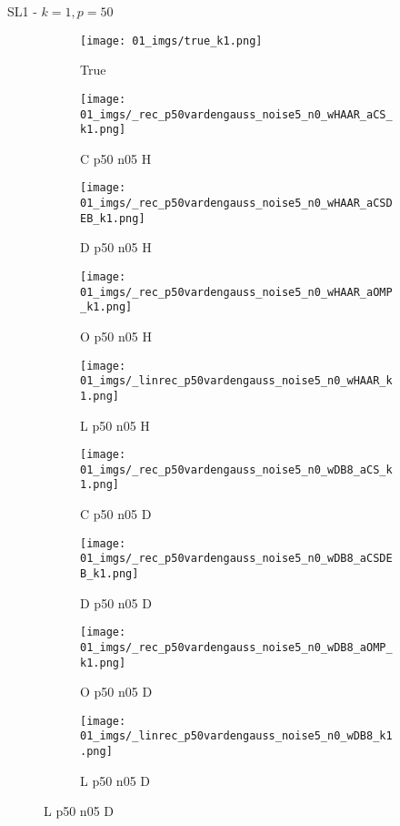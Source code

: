 \begin{frame}{SL1 - $k=1,p=50$}{}
\begin{figure}
\begin{subfigure}{0.1\textwidth}
\texttt{[image: 01\_imgs/true\_k1.png]}
\caption*{\Tiny True}
\end{subfigure}
\begin{subfigure}{0.1\textwidth}
\texttt{[image: 01\_imgs/\_rec\_p50vardengauss\_noise5\_n0\_wHAAR\_aCS\_k1.png]}
\caption*{\Tiny C p50 n05 H}
\end{subfigure}
\begin{subfigure}{0.1\textwidth}
\texttt{[image: 01\_imgs/\_rec\_p50vardengauss\_noise5\_n0\_wHAAR\_aCSDEB\_k1.png]}
\caption*{\Tiny D p50 n05 H}
\end{subfigure}
\begin{subfigure}{0.1\textwidth}
\texttt{[image: 01\_imgs/\_rec\_p50vardengauss\_noise5\_n0\_wHAAR\_aOMP\_k1.png]}
\caption*{\Tiny O p50 n05 H}
\end{subfigure}
\begin{subfigure}{0.1\textwidth}
\texttt{[image: 01\_imgs/\_linrec\_p50vardengauss\_noise5\_n0\_wHAAR\_k1.png]}
\caption*{\Tiny L p50 n05 H}
\end{subfigure}
\begin{subfigure}{0.1\textwidth}
\texttt{[image: 01\_imgs/\_rec\_p50vardengauss\_noise5\_n0\_wDB8\_aCS\_k1.png]}
\caption*{\Tiny C p50 n05 D}
\end{subfigure}
\begin{subfigure}{0.1\textwidth}
\texttt{[image: 01\_imgs/\_rec\_p50vardengauss\_noise5\_n0\_wDB8\_aCSDEB\_k1.png]}
\caption*{\Tiny D p50 n05 D}
\end{subfigure}
\begin{subfigure}{0.1\textwidth}
\texttt{[image: 01\_imgs/\_rec\_p50vardengauss\_noise5\_n0\_wDB8\_aOMP\_k1.png]}
\caption*{\Tiny O p50 n05 D}
\end{subfigure}
\begin{subfigure}{0.1\textwidth}
\texttt{[image: 01\_imgs/\_linrec\_p50vardengauss\_noise5\_n0\_wDB8\_k1.png]}
\caption*{\Tiny L p50 n05 D}
\end{subfigure}

\vspace{5pt}


\end{figure}
\end{frame}
